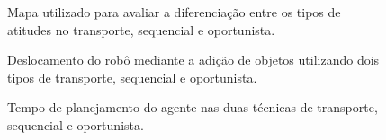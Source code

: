 \begin{figure}[h]
  \centering
  \setlength{\fboxsep}{0pt}
  \caption[Mapa utilizado nos testes sequencial e oportunista]{Mapa utilizado para avaliar a diferenciação entre os tipos de atitudes no transporte, sequencial e oportunista.}
  \label{fig:cenario_sequencial_oportunista}
\end{figure}

\begin{figure}[h]
  \centering
  \setlength{\fboxsep}{0pt}
  \caption[Deslocamento do robô mediante nos transportes sequencial e oportunista]{Deslocamento do robô mediante a adição de objetos utilizando dois tipos de transporte, sequencial e oportunista.}
  \label{fig:cenario_sequencial_oportunista_deslocamento}
\end{figure}

\begin{figure}[h]
  \centering
  \setlength{\fboxsep}{0pt}
  \caption[Tempo de planejamento do agente nos transporte sequencial e oportunista]{Tempo de planejamento do agente nas duas técnicas de transporte, sequencial e oportunista.}
  \label{fig:cenario_sequencial_oportunista_tempo}
\end{figure}

